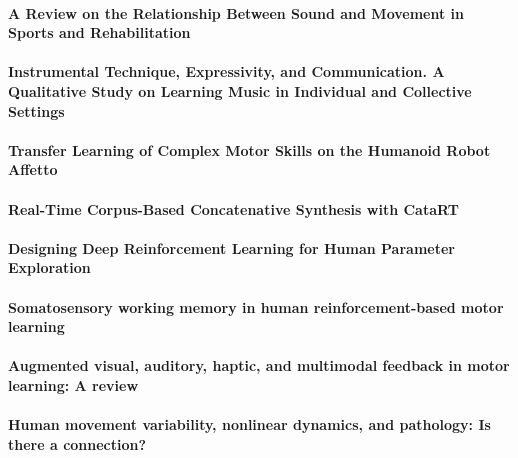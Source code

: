 \documentclass[11pt]{article}
\begin{document}
\paragraph{A Review on the Relationship Between Sound and Movement in Sports and Rehabilitation} \citep{schaffert_review_2019}

\paragraph{Instrumental Technique, Expressivity, and Communication. A Qualitative Study on Learning Music in Individual and Collective Settings} \citep{schiavio_instrumental_2019}

\paragraph{Transfer Learning of Complex Motor Skills on the Humanoid Robot Affetto} \citep{schulz_transfer_2018}

\paragraph{Real-Time Corpus-Based Concatenative Synthesis with CataRT} \citep{schwarz_real-time_2006}

\paragraph{Designing Deep Reinforcement Learning for Human Parameter Exploration} \citep{scurto_designing_2019}

\paragraph{Somatosensory working memory in human reinforcement-based motor learning} \citep{sidarta_somatosensory_2018}

\paragraph{Augmented visual, auditory, haptic, and multimodal feedback in motor learning: A review} \citep{sigrist_augmented_2013}

\paragraph{Human movement variability, nonlinear dynamics, and pathology: Is there a connection?} \citep{stergiou_human_2011}
\end{document}
